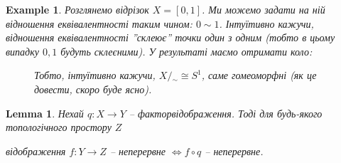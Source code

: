 \documentclass[a4paper, 10pt]{article}
\theoremstyle{theoremdd}
\newtheorem{example}[theorem]{Example}
\newtheorem{lemma}[theorem]{Lemma}
\begin{document}
\begin{example}
Розглянемо відрізок $X = [0,1]$. Ми можемо задати на ній відношення еквівалентності таким чином: $0 \sim 1$. Інтуїтивно кажучи, відношення еквівалентності ''склеює'' точки один з одним (тобто в цьому випадку $0,1$ будуть склеєними). У результаті маємо отримати коло:
\begin{figure}[H]
\centering
{}
\qquad
{}
\caption*{Тобто, інтуїтивно кажучи, $X/{_\sim} \cong S^1$, саме гомеоморфні \textit{(як це довести, скоро буде ясно)}.}
\end{figure}

\end{example}

\begin{lemma}
\label{compose_of_quotient_continuous}
Нехай $q \colon X \to Y$ -- факторвідображення. Тоді для будь-якого топологічного простору $Z$
\begin{center}
відображення $f \colon Y \to Z$ -- неперервне $\iff f \circ q$ -- неперервне.
\begin{figure}[H]
\centering
{}
\end{figure}
\end{center}
\end{lemma}
\end{document}
